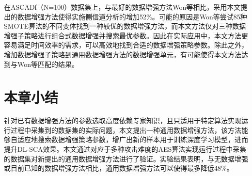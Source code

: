 {	在ASCADf（N=100）数据集上，与最好的数据增强方法Won等\citep{Won20}相比，采用本文提出的数据增强方法使得实施侧信道分析的\chenggongtiaoshu 增加52\%。可能的原因是Won等\citep{Won20}尝试85种SMOTE算法的不同变体\citep{Kovcs19}找到一种较优的数据增强方法，而本文方法仅对三种数据增强子策略进行组合式数据增强并搜索最优参数。因此在实际应用中，本文方法更容易满足时间效率的需求，可以高效地找到合适的数据增强策略参数。除此之外，增加数据增强子策略到通用数据增强方法的数据增强单元，有可能使得本文方法达到与Won等\citep{Won20}匹配的结果。
	\section{本章小结}
	针对已有数据增强方法的参数选取高度依赖专家知识，且只适用于特定算法实现运行过程中采集到的数据集的实际问题，本文提出一种通用数据增强方法，该方法能够自适应地搜索数据增强策略参数，增广出新的样本用于训练深度学习模型，进而提升DL-SCA效果。本文通过对应于多种攻击难度的AES算法实现运行过程中采集的数据集对新提出的通用数据增强方法进行了验证。实验结果表明，与无数据增强或目前已知的数据增强方法相比，通用数据增强方法可以使得\chenggongtiaoshu 最多降低48\%。
}